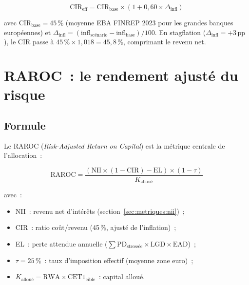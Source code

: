\documentclass[12pt, a4paper, twoside, openright]{report}
\theoremstyle{definition}
\begin{document}
\begin{equation}
\text{CIR}_{\text{eff}} = \text{CIR}_{\text{base}} \times (1 + 0{,}60 \times \Delta_{\text{infl}})
\label{eq:cir-infl}
\end{equation}

\noindent avec $\text{CIR}_{\text{base}} = 45\,\%$ (moyenne EBA FINREP 2023 pour les grandes banques européennes) et $\Delta_{\text{infl}} = (\text{infl}_{\text{scénario}} - \text{infl}_{\text{base}}) / 100$. En stagflation ($\Delta_{\text{infl}} = +3\,\text{pp}$), le CIR passe à $45\,\% \times 1{,}018 = 45{,}8\,\%$, comprimant le revenu net.

\section{RAROC~: le rendement ajusté du risque}
\label{sec:metriques:raroc}

\subsection{Formule}

Le RAROC (\emph{Risk-Adjusted Return on Capital}) est la métrique centrale de l'allocation~:

\begin{equation}
\text{RAROC} = \frac{(\text{NII} \times (1 - \text{CIR}) - \text{EL}) \times (1 - \tau)}{K_{\text{alloué}}}
\label{eq:raroc}
\end{equation}

\noindent avec~:
\begin{itemize}[nosep]
  \item NII~: revenu net d'intérêts (section~\ref{sec:metriques:nii})~;
  \item CIR~: ratio coût/revenu (45\,\%, ajusté de l'inflation)~;
  \item EL~: perte attendue annuelle ($\sum \text{PD}_{\text{stressée}} \times \text{LGD} \times \text{EAD}$)~;
  \item $\tau = 25\,\%$~: taux d'imposition effectif (moyenne zone euro)~;
  \item $K_{\text{alloué}} = \text{RWA} \times \text{CET1}_{\text{cible}}$~: capital alloué.
\end{itemize}
\end{document}
